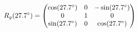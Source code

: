 \documentclass[preview]{standalone}
\begin{document}
\begin{align*}
\special{dvisvgm:raw <g id='unique000'>}R_y(27.7^\circ) = \begin{pmatrix} \cos(27.7^\circ) & 0 & -\sin(27.7^\circ) \\ 0 & 1 & 0 \\ \sin(27.7^\circ) & 0 & \cos(27.7^\circ) \end{pmatrix}\special{dvisvgm:raw </g>}
\end{align*}
\end{document}
